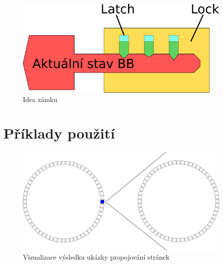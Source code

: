 \begin{figure}[H]
    \begin{small}
        \begin{center}
            \includegraphics[width=0.95\textwidth]{img/lock.png}
        \end{center}
        \caption{Idea zámku}
        \label{fig:lock}
    \end{small}
\end{figure}

\newpage

\section{Příklady použití}



\begin{figure}[H]
    \begin{small}
        \begin{center}
            \includegraphics[width=0.95\textwidth]{img/pageLink.png}
        \end{center}
        \caption{Vizualizace výsledku ukázky propojování stránek}
        \label{fig:pageLink}
    \end{small}
\end{figure}

